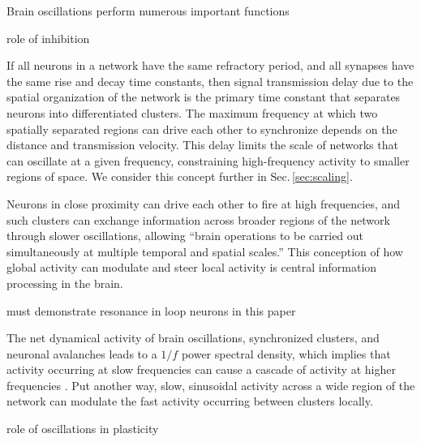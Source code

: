 \documentclass[twocolumn]{article}
\begin{document}
\vspace{3em}
Brain oscillations perform numerous important functions

\vspace{3em}
role of inhibition

\vspace{3em}
If all neurons in a network have the same refractory period, and all synapses have the same rise and decay time constants, then signal transmission delay due to the spatial organization of the network is the primary time constant that separates neurons into differentiated clusters. The maximum frequency at which two spatially separated regions can drive each other to synchronize depends on the distance and transmission velocity. This delay limits the scale of networks that can oscillate at a given frequency, constraining high-frequency activity to smaller regions of space. We consider this concept further in Sec.\,\ref{sec:scaling}. 

\vspace{3em}
Neurons in close proximity can drive each other to fire at high frequencies, and such clusters can exchange information across broader regions of the network through slower oscillations, allowing ``brain operations to be carried out simultaneously at multiple temporal and spatial scales.'' \cite{budr2004} This conception of how global activity can modulate and steer local activity is central information processing in the brain. 

\vspace{3em}
must demonstrate resonance in loop neurons in this paper

\vspace{3em}
The net dynamical activity of brain oscillations, synchronized clusters, and neuronal avalanches leads to a $1/f$ power spectral density, which implies that activity occurring at slow frequencies can cause a cascade of activity at higher frequencies \cite{budr2004}. Put another way, slow, sinusoidal activity across a wide region of the network can modulate the fast activity occurring between clusters locally.  

\vspace{3em}
role of oscillations in plasticity \cite{bu2006,budr2004,li1997}
\end{document}
